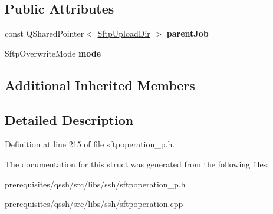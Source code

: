 \subsection*{Public Attributes}
\begin{DoxyCompactItemize}
\item 
\mbox{\label{struct_q_ssh_1_1_internal_1_1_sftp_upload_file_ac479e486a05b98d25ee0e4475eadfe09}} 
const Q\+Shared\+Pointer$<$ \mbox{\hyperlink{struct_q_ssh_1_1_internal_1_1_sftp_upload_dir}{Sftp\+Upload\+Dir}} $>$ {\bfseries parent\+Job}
\item 
\mbox{\label{struct_q_ssh_1_1_internal_1_1_sftp_upload_file_a286a25ecae947054906fc334ab9ec6f5}} 
Sftp\+Overwrite\+Mode {\bfseries mode}
\end{DoxyCompactItemize}
\subsection*{Additional Inherited Members}


\subsection{Detailed Description}


Definition at line 215 of file sftpoperation\+\_\+p.\+h.



The documentation for this struct was generated from the following files\+:\begin{DoxyCompactItemize}
\item 
prerequisites/qssh/src/libs/ssh/sftpoperation\+\_\+p.\+h\item 
prerequisites/qssh/src/libs/ssh/sftpoperation.\+cpp\end{DoxyCompactItemize}
